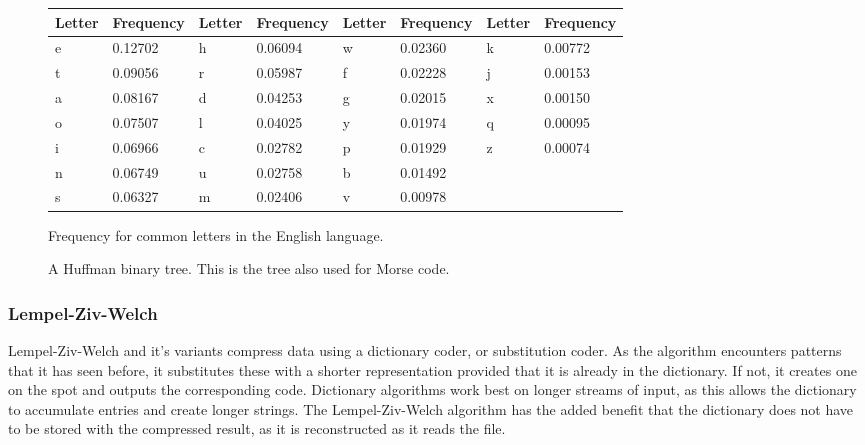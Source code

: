 \documentclass[12pt]{article}
\begin{document}
\begin{center}
\begin{figure}[!htbp]
\begin{tabular}{| l | l | l | l | l | l | l | l |}
\hline
Letter & Frequency & Letter & Frequency & Letter & Frequency & Letter & Frequency \\ \hline
e & 0.12702 & h & 0.06094 & w & 0.02360 & k & 0.00772 \\ \hline
t & 0.09056 & r & 0.05987 & f & 0.02228 & j & 0.00153 \\
 \hline
a & 0.08167 & d & 0.04253 & g & 0.02015 & x & 0.00150 \\ \hline
o & 0.07507 & l & 0.04025 & y & 0.01974 & q & 0.00095 \\ \hline
i & 0.06966 & c & 0.02782 & p & 0.01929 & z & 0.00074 \\ \hline
n & 0.06749 & u & 0.02758 & b & 0.01492 &   &         \\ \hline
s & 0.06327 & m & 0.02406 & v & 0.00978 &   &         \\ \hline
\end{tabular}
\caption{Frequency for common letters in the English language.}
\end{figure}
\end{center}   

\begin{figure}[!htbp]
\begin{center}
\caption{A Huffman binary tree. This is the tree also used for Morse code.}
\end{center}
\end{figure}

\subsubsection{Lempel-Ziv-Welch} Lempel-Ziv-Welch and it's variants compress data using a dictionary coder, or substitution coder. As the algorithm encounters patterns that it has seen before, it substitutes these with a shorter representation provided that it is already in the dictionary. If not, it creates one on the spot and outputs the corresponding code. Dictionary algorithms work best on longer streams of input, as this allows the dictionary to accumulate entries and create longer strings. The Lempel-Ziv-Welch algorithm has the added benefit that the dictionary does not have to be stored with the compressed result, as it is reconstructed as it reads the file. \citep{Ziv}
\end{document}
